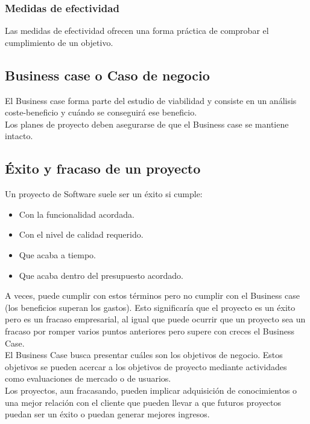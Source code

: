 \documentclass[12pt]{article}
\begin{document}
\subsubsection{Medidas de efectividad}
\label{1.10.2}

{Las medidas de efectividad ofrecen una forma práctica de comprobar el cumplimiento de un objetivo.}

\subsection{Business case o Caso de negocio}
\label{1.11.0}

{El Business case forma parte del estudio de viabilidad y consiste en un análisis coste-beneficio y cuándo se conseguirá ese beneficio.}\\

{Los planes de proyecto deben asegurarse de que el Business case se mantiene intacto.}

\subsection{Éxito y fracaso de un proyecto}
\label{1.12.0}

{Un proyecto de Software suele ser un éxito si cumple:}

\begin{itemize}
    \item {Con la funcionalidad acordada.}
    \item {Con el nivel de calidad requerido.}
    \item {Que acaba a tiempo.}
    \item {Que acaba dentro del presupuesto acordado.}
\end{itemize}

{A veces, puede cumplir con estos términos pero no cumplir con el Business case (los beneficios superan los gastos). Esto significaría que el proyecto es un éxito pero es un fracaso empresarial, al igual que puede ocurrir que un proyecto sea un fracaso por romper varios puntos anteriores pero supere con creces el Business Case.}\\

{El Business Case busca presentar cuáles son los objetivos de negocio. Estos objetivos se pueden acercar a los objetivos de proyecto mediante actividades como evaluaciones de mercado o de usuarios.}\\

{Los proyectos, aun fracasando, pueden implicar adquisición de conocimientos o una mejor relación con el cliente que pueden llevar a que futuros proyectos puedan ser un éxito o puedan generar mejores ingresos.}
\end{document}
